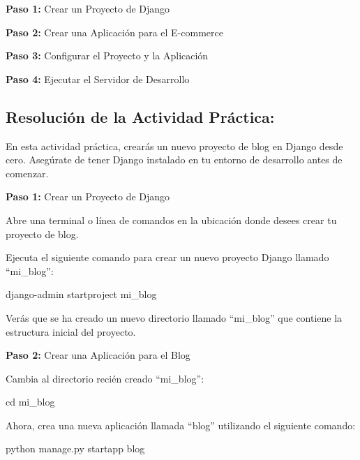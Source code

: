 \documentclass[
  letterpaper,
  DIV=11,
  numbers=noendperiod]{scrartcl}
\newenvironment{Shaded}{\begin{snugshade}}{\end{snugshade}}
\newcommand{\BuiltInTok}[1]{\textcolor[rgb]{0.00,0.23,0.31}{#1}}
\newcommand{\ExtensionTok}[1]{\textcolor[rgb]{0.00,0.23,0.31}{#1}}
\newcommand{\NormalTok}[1]{\textcolor[rgb]{0.00,0.23,0.31}{#1}}
\begin{document}
\textbf{Paso 1:} Crear un Proyecto de Django

\textbf{Paso 2:} Crear una Aplicación para el E-commerce

\textbf{Paso 3:} Configurar el Proyecto y la Aplicación

\textbf{Paso 4:} Ejecutar el Servidor de Desarrollo

\hypertarget{resoluciuxf3n-de-la-actividad-pruxe1ctica}{%
\subsection{Resolución de la Actividad
Práctica:}\label{resoluciuxf3n-de-la-actividad-pruxe1ctica}}

En esta actividad práctica, crearás un nuevo proyecto de blog en Django
desde cero. Asegúrate de tener Django instalado en tu entorno de
desarrollo antes de comenzar.

\textbf{Paso 1:} Crear un Proyecto de Django

Abre una terminal o línea de comandos en la ubicación donde desees crear
tu proyecto de blog.

Ejecuta el siguiente comando para crear un nuevo proyecto Django llamado
``mi\_blog'':

\begin{Shaded}
\begin{Highlighting}[]
\ExtensionTok{django{-}admin}\NormalTok{ startproject mi\_blog}
\end{Highlighting}
\end{Shaded}

Verás que se ha creado un nuevo directorio llamado ``mi\_blog'' que
contiene la estructura inicial del proyecto.

\textbf{Paso 2:} Crear una Aplicación para el Blog

Cambia al directorio recién creado ``mi\_blog'':

\begin{Shaded}
\begin{Highlighting}[]
\BuiltInTok{cd}\NormalTok{ mi\_blog}
\end{Highlighting}
\end{Shaded}

Ahora, crea una nueva aplicación llamada ``blog'' utilizando el
siguiente comando:

\begin{Shaded}
\begin{Highlighting}[]
\ExtensionTok{python}\NormalTok{ manage.py startapp blog}
\end{Highlighting}
\end{Shaded}
\end{document}
